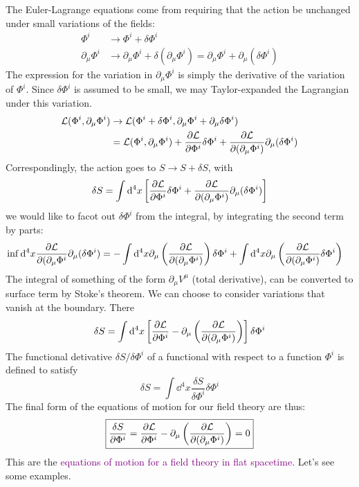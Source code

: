 The Euler-Lagrange equations come from requiring that the action be unchanged under small variations of the fields:
\begin{align*}
    \Phi^{i}&\to\Phi^{i} + \delta\Phi^{i}\\
    \partial_\mu\Phi^{i}&\to \partial_\mu\Phi^{i} + \delta(\partial_\mu\Phi^{i}) = \partial_\mu\Phi^{i} + \partial_\mu(\delta\Phi^{i})
\end{align*}
The expression for the variation in $\partial_\mu\Phi^{i}$ is simply the derivative of the variation of $\Phi^{i}$. Since $\delta \Phi^{i}$ is assumed to be small, we may Taylor-expanded the Lagrangian under this variation.
\begin{align*}
    \mathcal{L}(\Phi^{i},\partial_\mu\Phi^{i})&\to \mathcal{L}(\Phi^{i}+\delta\Phi^{i},\partial_\mu\Phi^{i}+\partial_\mu\delta\Phi^{i})\\
    &=\mathcal{L}(\Phi^{i},\partial_\mu\Phi^{i})+\pdv{\mathcal{L}}{\Phi^{i}}\delta\Phi^{i}+\pdv{\mathcal{L}}{(\partial_\mu\Phi^{i})}\partial_\mu (\delta\Phi^{i})
\end{align*}
Correspondingly, the action goes to $S\to S+\delta S$, with
\begin{equation*}
    \delta S=\int\dd^4 x\left[\pdv{\mathcal{L}}{\Phi^{i}}\delta\Phi^{i}+\pdv{\mathcal{L}}{(\partial_\mu\Phi^{i})}\partial_\mu (\delta\Phi^{i})\right]
\end{equation*}
we would like to facot out $\delta\Phi^{i}$ from the integral, by integrating the second term by parts:
\begin{align*}
    \inf\dd^4 x\pdv{\mathcal{L}}{(\partial_\mu\Phi^{i}}\partial_\mu(\delta\Phi^{i})&=-\int\dd^4 x\partial_\mu\left(\pdv{\mathcal{L}}{(\partial_\mu\Phi^{i})}\right)\delta\Phi^{i} + \int\dd^4 x\partial_\mu\left(\pdv{\mathcal{L}}{(\partial_\mu\Phi^{i})}\delta\Phi^{i}\right)
\end{align*}
The integral of something of the form $\partial_\mu V^\mu$ (total derivative), can be converted to surface term by Stoke's theorem. We can choose to consider variations that vanish at the boundary. There
\begin{equation*}
    \delta S=\int\dd^4 x\left[\pdv{\mathcal{L}}{\Phi^{i}}-\partial_\mu\left(\pdv{\mathcal{L}}{(\partial_\mu\Phi^{i})}\right)\right]\delta\Phi^{i}
\end{equation*}
The functional detivative $\delta S/\delta\Phi^{i}$ of a functional with respect to a function $\Phi^{i}$ is defined to satisfy
\begin{equation*}
    \delta S=\int\dd^4 x\frac{\delta S}{\delta\Phi^{i}}\delta\Phi^{i}
\end{equation*}
The final form of the equations of motion for our field theory are thus:
\begin{equation}\label{1eq:ELE}
    \boxed{\frac{\delta S}{\partial\Phi^{i}}=\pdv{\mathcal{L}}{\Phi^{i}}-\partial_\mu\left(\pdv{\mathcal{L}}{(\partial_\mu\Phi^{i})}\right)=0}
\end{equation}
This are the \textcolor{purple}{equations of motion for a field theory in flat spacetime}.
Let's see some examples.

